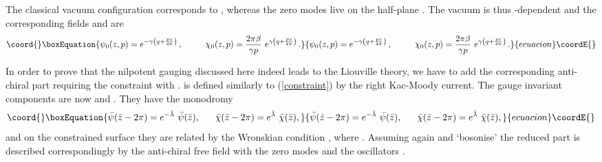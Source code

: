 \documentclass[a4paper,12pt]{article}
\begin{document}
\noindent
The classical vacuum configuration corresponds to \coordHE{}, whereas
the zero modes live on the half-plane \coordHE{}.
The vacuum is thus \coordHE{}-dependent and the corresponding fields
\coordHE{} and \coordHE{} are
\begin{equation}\coord{}\boxEquation{\label{vacuum}
\psi_0 (z,p)= e^{-\gamma\left (q+\frac{pz}{4\pi}\right)}\,,~~~~~~~~
\chi_0 (z,p)= \frac{2\pi\beta}{\gamma p}\,\,e^{\gamma\left (q
+\frac{ pz}{4\pi}\right)}\,.
}{\psi_0 (z,p)= e^{-\gamma\left (q+\frac{pz}{4\pi}\right)}\,,~~~~~~~~
\chi_0 (z,p)= \frac{2\pi\beta}{\gamma p}\,\,e^{\gamma\left (q
+\frac{ pz}{4\pi}\right)}\,.
}{ecuacion}\coordE{}\end{equation}


\noindent
In order to prove that the nilpotent gauging discussed here indeed leads
to the Liouville theory, we have to add the corresponding
anti-chiral part requiring the constraint \coordHE{}
with \coordHE{}. \coordHE{} is defined similarly to
(\ref{constraint}) by the right Kac-Moody current. The gauge invariant
components are now \coordHE{} and
\coordHE{}. They have the
monodromy
\begin{equation}\coord{}\boxEquation{\label{monodromy-psibar}
\bar\psi(\bar z-2\pi)=e^{-\bar\lambda}\,\,\bar\psi(\bar z),~~~~~
\bar\chi(\bar z-2\pi)=e^{\bar\lambda}\,\,\bar\chi(\bar z),
}{\bar\psi(\bar z-2\pi)=e^{-\bar\lambda}\,\,\bar\psi(\bar z),~~~~~
\bar\chi(\bar z-2\pi)=e^{\bar\lambda}\,\,\bar\chi(\bar z),
}{ecuacion}\coordE{}\end{equation}
and on the constrained surface they are related by the Wronskian
condition \coordHE{}, where \myHighlight{$\bar\beta
=\gamma^2\bar\rho$}\coordHE{}. Assuming again \coordHE{} and `bosonise'
\coordHE{}
the reduced part is described correspondingly by
the anti-chiral free field \coordHE{} with the zero modes
\coordHE{}  and the oscillators \coordHE{}.
\end{document}
